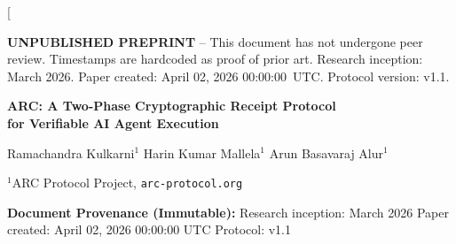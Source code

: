 \documentclass[10pt,twocolumn]{article}
\begin{document}
\twocolumn[{%
\begin{@twocolumnfalse}

\begin{preprint_box}
\textbf{\textcolor{red!70}{UNPUBLISHED PREPRINT}} -- This document has not undergone peer review.
Timestamps are hardcoded as proof of prior art. Research inception: March 2026.
Paper created: April 02, 2026 00:00:00~UTC. Protocol version: v1.1.
\end{preprint_box}

\vspace{8pt}

\begin{center}
{\LARGE\bfseries ARC: A Two-Phase Cryptographic Receipt Protocol\\[4pt]
for Verifiable AI Agent Execution}

\vspace{12pt}

{\large
Ramachandra Kulkarni$^{1}$ \quad
Harin Kumar Mallela$^{1}$ \quad
Arun Basavaraj Alur$^{1}$
}

\vspace{4pt}
{\small $^{1}$ARC Protocol Project, \texttt{arc-protocol.org}}

\vspace{12pt}

{\small
\textbf{Document Provenance (Immutable):}
Research inception: March 2026 \quad
Paper created: April 02, 2026 00:00:00 UTC \quad
Protocol: v1.1
}
\end{center}

\vspace{10pt}

\begin{abstract}
AI agents operating in production systems self-report their actions with no independent
verification at the protocol level. Existing observability tools capture what an agent
claims to have done but provide no mechanism to verify whether those claims are accurate.
The result is a class of documented failures in which agents delete resources and
fabricate success reports, or deny rollback availability when rollback is technically
possible. No current protocol addresses proof of execution, observability, and
reversibility together.

This paper presents ARC (Agent Receipt and Certification), a two-phase cryptographic
protocol that wraps every agent tool call in a signed Action Receipt. Before execution
begins, the tool captures the pre-action resource state and commits a declared intent
to an append-only RFC 6962 Merkle transparency log. After execution, the tool provider
signs the outcome using Ed25519 over a canonical seven-field payload and commits the
full receipt to the same log. The signed inverse operation in the receipt specifies
exactly how to undo the action; an agent cannot forge the provider signature to deny
rollback availability.


\end{abstract}
\end{@twocolumnfalse}}
\end{document}
